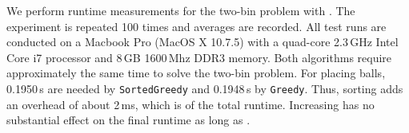 \documentclass[12pt,psfig,a4]{article}
\newcommand{\sg}{\texttt{SortedGreedy}}
\newcommand{\gr}{\texttt{Greedy}}
\theoremstyle{plain}
\begin{document}
We perform runtime measurements for the two-bin problem with . The experiment is repeated 100 times and averages are recorded. All test runs are conducted on a Macbook Pro (MacOS X 10.7.5) with a quad-core 2.3\,GHz Intel Core i7 processor and 8\,GB 1600\,Mhz DDR3 memory. Both algorithms require approximately the same time to solve the two-bin problem. For placing  balls, 0.1950\,s are needed by \sg{} and 0.1948\,s by \gr{}. Thus, sorting adds an overhead of about 2\,ms, which is  of the total runtime. Increasing  has no substantial effect on the final runtime as long as . \\
\end{document}
